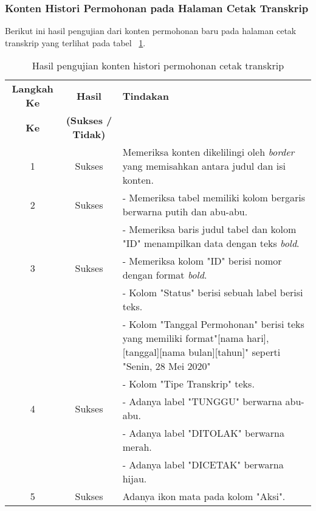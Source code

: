 \subsubsection{Konten Histori Permohonan pada Halaman Cetak Transkrip}
Berikut ini hasil pengujian dari konten permohonan baru pada halaman cetak transkrip yang terlihat pada tabel ~\ref{hasil:HistoriPermohonan}.
\begin{table}[H]
	\centering 
	\caption{Hasil pengujian konten histori permohonan cetak transkrip}
	\label{hasil:HistoriPermohonan}
	\begin{tabular}{|c| c| p{}|}
		\toprule
		\textbf{Langkah Ke} & \textbf{Hasil} & \textbf{Tindakan}\\
		\textbf{Ke} & \textbf{(Sukses / Tidak)} &\\
		\midrule
		1&Sukses&Memeriksa konten dikelilingi oleh \textit{border} yang memisahkan antara judul dan isi konten.\\
		\hline
		2&Sukses&- Memeriksa tabel memiliki kolom bergaris berwarna putih dan abu-abu.\\
		&&- Memeriksa baris judul tabel dan kolom "ID" menampilkan data dengan teks \textit{bold}.\\
		\hline
		3&Sukses& - Memeriksa kolom "ID" berisi nomor dengan format \textit{bold}.\\
		&& - Kolom "Status" berisi sebuah label berisi teks. \\
		&& - Kolom "Tanggal Permohonan" berisi teks yang memiliki format"[nama hari], [tanggal][nama bulan][tahun]" seperti "Senin, 28 Mei 2020" \\
		&& - Kolom "Tipe Transkrip" teks.\\
		\hline
		4&Sukses& - Adanya label "TUNGGU" berwarna abu-abu.\\
		&& - Adanya label "DITOLAK" berwarna merah.\\
		&& - Adanya label "DICETAK" berwarna hijau.\\
		\hline
		5&Sukses& Adanya ikon mata pada kolom "Aksi".\\
		
		\bottomrule		
	\end{tabular} 
\end{table}


